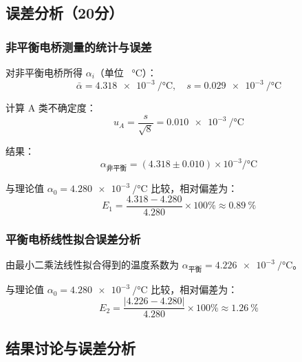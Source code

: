 \documentclass{../../templates/Report}%
\begin{document}
\begin{fullreportonly}
    \subsection{误差分析（20分）}

    \subsubsection{非平衡电桥测量的统计与误差}
    对非平衡电桥所得 $\alpha_i$（单位 \si{\per\degreeCelsius}）：
    \begin{equation}
        \bar{\alpha} = \SI{4.318e-3}{\per\degreeCelsius}, \quad s = \SI{0.029e-3}{\per\degreeCelsius}
    \end{equation}

    计算 A 类不确定度：
    \begin{equation}
        u_A = \frac{s}{\sqrt{8}} = \SI{0.010e-3}{\per\degreeCelsius}
    \end{equation}

    结果：
    \begin{equation}
        \alpha_{\text{非平衡}} = (\num{4.318} \pm \num{0.010}) \times 10^{-3} \si{\per\degreeCelsius}
    \end{equation}

    与理论值 $\alpha_{0} = \SI{4.280e-3}{\per\degreeCelsius}$ 比较，相对偏差为：
    \begin{equation}
        E_1 = \frac{4.318 - 4.280}{4.280} \times 100\% \approx \SI{0.89}{\percent}
    \end{equation}

    \subsubsection{平衡电桥线性拟合误差分析}
    由最小二乘法线性拟合得到的温度系数为 $\alpha_{\text{平衡}} = \SI{4.226e-3}{\per\degreeCelsius}$。

    与理论值 $\alpha_{0} = \SI{4.280e-3}{\per\degreeCelsius}$ 比较，相对偏差为：
    \begin{equation}
        E_2 = \frac{\left|4.226 - 4.280\right|}{4.280} \times 100\% \approx \SI{1.26}{\percent}
    \end{equation}

    \subsection{结果讨论与误差分析}


\end{fullreportonly}
\end{document}
